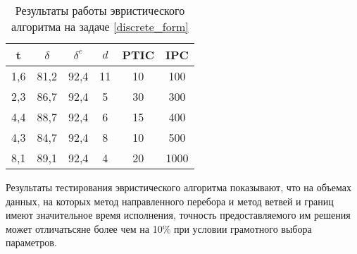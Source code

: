 \begin{table}[H]
	\caption{\label{tab:brute_heuristic1}Результаты работы эвристического алгоритма на задаче \ref{discrete_form}}
	\begin{center}
		\begin{tabular}{|c|c|c|c|c|c|}
			\hline
			t & $\delta$ & $\delta^{e}$ & $d$  & PTIC & IPC \\
			\hline
			1,6 & 81,2 & 92,4 & 11 & 10 & 100\\
			\hline
			2,3 & 86,7 & 92,4 & 5 & 30 & 300\\
			\hline
			4,4 & 88,7 & 92,4 &  6 & 15 & 400\\
			\hline			
			4,3 & 84,7 & 92,4 &  8 & 10 & 500\\
			\hline
			8,1 & 89,1 & 92,4 &  4 & 20 & 1000\\
			\hline						
		\end{tabular}
	\end{center}
\end{table} 

Результаты тестирования эвристического алгоритма показывают, что на объемах данных, на которых метод направленного перебора и метод ветвей и границ имеют значительное время исполнения, точность предоставляемого им решения может отличатьсяне более чем на 10\% при условии грамотного выбора параметров.
